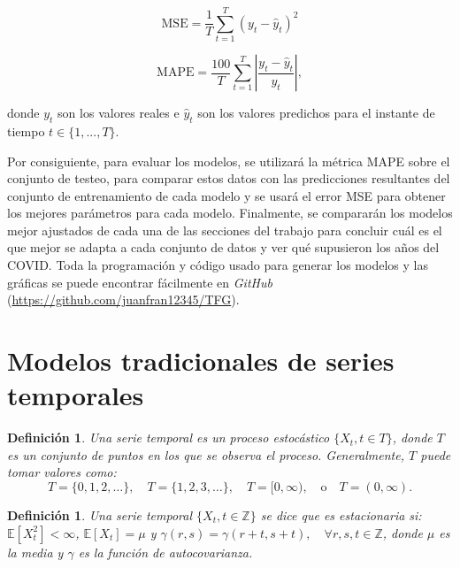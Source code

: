 \documentclass[12pt,twoside]{article}
\newtheorem{definition}[theorem]{Definición}
\begin{document}
\begin{equation}
\mathrm{MSE} = \frac{1}{T} \sum_{t=1}^{T} (y_t - \hat{y}_t)^2
\end{equation}

\begin{equation}
\mathrm{MAPE} = \frac{100}{T} \sum_{t=1}^{T} \left| \frac{y_t - \hat{y}_t}{y_t} \right|,
\end{equation}

donde $y_t$ son los valores reales e $\hat{y}_t$ son los valores predichos para el instante de tiempo $t \in \{1,...,T\}$.

Por consiguiente, para evaluar los modelos, se utilizará la métrica MAPE sobre el conjunto de testeo, para comparar estos datos con las predicciones resultantes del conjunto de entrenamiento de cada modelo y se usará el error MSE para obtener los mejores parámetros para cada modelo. Finalmente, se compararán los modelos mejor ajustados de cada una de las secciones del trabajo para concluir cuál es el que mejor se adapta a cada conjunto de datos y ver qué supusieron los años del COVID. Toda la programación y código usado para generar los modelos y las gráficas se puede encontrar fácilmente en \textit{GitHub} (\url{https://github.com/juanfran12345/TFG}).

\newpage


\section{Modelos tradicionales de series temporales}\label{sec:34}

\begin{definition}
Una serie temporal \cite{sarima1} es un proceso estocástico $\{X_t, t \in T\}$, donde $T$ es un conjunto de puntos en los que se observa el proceso. Generalmente, $T$ puede tomar valores como:
\begin{equation}
T = \{0, 1, 2, \dots\}, \quad T = \{1, 2, 3, \dots\}, \quad T = [0, \infty), \quad \text{o} \quad T = (0, \infty).
\end{equation}
\end{definition}

\begin{definition}
Una serie temporal $\{X_t, t \in \mathbb{Z}\}$ se dice que es estacionaria si: $\mathbb{E}[X_t^2] < \infty$, $\mathbb{E}[X_t] = \mu$ y $\gamma(r, s) = \gamma(r + t, s + t), \quad \forall r, s, t \in \mathbb{Z}$, donde $\mu$ es la media y $\gamma$ es la función de autocovarianza.
\end{definition}
\end{document}
